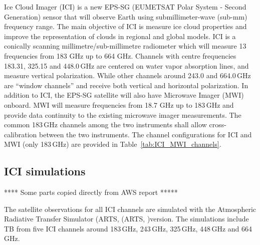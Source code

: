 \documentclass[amt, manuscript]{copernicus}
\begin{document}
Ice Cloud Imager (ICI) is a new EPS-SG (EUMETSAT Polar System - Second Generation) sensor that will observe  Earth using submillimeter-wave (sub-mm) frequency range. The main objective of ICI is measure ice cloud properties and improve the representation of clouds in regional and global models. ICI is a conically scanning millimetre/sub-millimetre radiometer which will measure 13 frequencies from 183 GHz up to 664 GHz. Channels with centre frequencies 183.31, 325.15 and 448.0\,GHz are centered on water vapor absorption lines, and measure vertical polarization. While other channels around 243.0 and 664.0\,GHz are ``window channels'' and receive both vertical and horizontal polarization. 
In addition to ICI, the EPS-SG satellite will also have Microwave Imager (MWI) onboard. MWI will measure frequencies from 18.7 GHz up to 183\,GHz and provide data continuity to the existing microwave imager measurements. The common 183\,GHz channels among the two instruments shall allow cross-calibration between the two instruments. The channel configurations for ICI and MWI (only 183\,GHz) are provided in Table~\ref{tab:ICI_MWI_channels}.

\subsection{ICI simulations}
\label{sec:arts_simulations}
%

**** Some parts copied directly from AWS report *****

The satellite observations for all ICI channels are simulated with the Atmospheric Radiative Transfer Simulator (ARTS, (ARTS, \citet{eriksson:arts2:11,buehler:artst:18})version. The simulations include TB from five ICI channels around 183\,GHz, 243\,GHz, 325\,GHz, 448\,GHz and 664\,GHz. 
\end{document}

